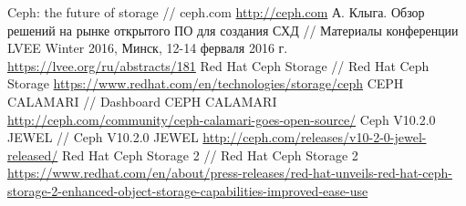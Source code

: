 \documentclass[10pt, a5paper]{article}
\begin{document}
\begin{thebibliography}{99}
 Ceph: the future of storage // ceph.com \url{http://ceph.com} 
 А. Клыга. Обзор решений на рынке открытого ПО для создания СХД // Материалы конференции LVEE Winter 2016, Минск, 12-14 ферваля 2016 г. \url{https://lvee.org/ru/abstracts/181}
 Red Hat Ceph Storage // Red Hat Ceph Storage \url{https://www.redhat.com/en/technologies/storage/ceph}
 CEPH CALAMARI // Dashboard CEPH CALAMARI \url{http://ceph.com/community/ceph-calamari-goes-open-source/}
 Ceph V10.2.0 JEWEL // Ceph V10.2.0 JEWEL \url{http://ceph.com/releases/v10-2-0-jewel-released/}
 Red Hat Ceph Storage 2 // Red Hat Ceph Storage 2 \url{https://www.redhat.com/en/about/press-releases/red-hat-unveils-red-hat-ceph-storage-2-enhanced-}\linebreak\url{object-storage-capabilities-improved-ease-use}
\end{thebibliography}
\end{document}

